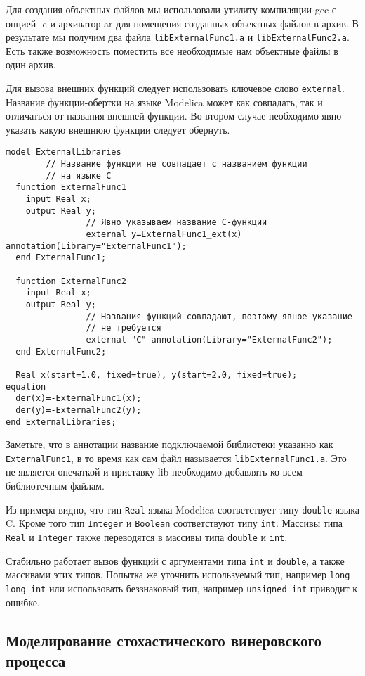 \documentclass[%
floatfix,
showkeys,
nofootinbib, %
superscriptaddress, %
]{revtex4-1}
\begin{document}
Для создания объектных файлов мы использовали утилиту компиляции gcc с
опцией -c и архиватор ar для помещения созданных объектных файлов в
архив. В результате мы получим два файла \verb|libExternalFunc1.a| и
\verb|libExternalFunc2.a|. Есть также возможность поместить все
необходимые нам объектные файлы в один архив.

Для вызова внешних функций следует использовать ключевое слово
\verb|external|. Название функции-обертки на языке Modelica может как
совпадать, так и отличаться от названия внешней функции. Во втором
случае необходимо явно указать какую внешнюю функции следует обернуть.
\begin{verbatim}
model ExternalLibraries
        // Название функции не совпадает с названием функции
        // на языке C
  function ExternalFunc1
    input Real x;
    output Real y;
                // Явно указываем название С-функции
                external y=ExternalFunc1_ext(x) annotation(Library="ExternalFunc1");
  end ExternalFunc1;

  function ExternalFunc2
    input Real x;
    output Real y;
                // Названия функций совпадают, поэтому явное указание
                // не требуется
                external "C" annotation(Library="ExternalFunc2");
  end ExternalFunc2;
  
  Real x(start=1.0, fixed=true), y(start=2.0, fixed=true);
equation
  der(x)=-ExternalFunc1(x);
  der(y)=-ExternalFunc2(y);
end ExternalLibraries;
\end{verbatim}

Заметьте, что в аннотации название подключаемой библиотеки указанно
как \verb|ExternalFunc1|, в то время как сам файл называется
\verb|libExternalFunc1.a|. Это не является опечаткой и приставку lib
необходимо добавлять ко всем библиотечным файлам.

Из примера видно, что тип \verb|Real| языка Modelica соответствует
типу \verb|double| языка C. Кроме того тип \verb|Integer| и
\verb|Boolean| соответствуют типу \verb|int|. Массивы типа \verb|Real|
и \verb|Integer| также переводятся в массивы типа \verb|double| и
\verb|int|.

Стабильно работает вызов функций с аргументами типа \verb|int| и
\verb|double|, а также массивами этих типов. Попытка же уточнить
используемый тип, например \verb|long long int| или использовать
беззнаковый тип, например \verb|unsigned int| приводит к ошибке.

\subsection{Моделирование стохастического винеровского процесса}
\end{document}

